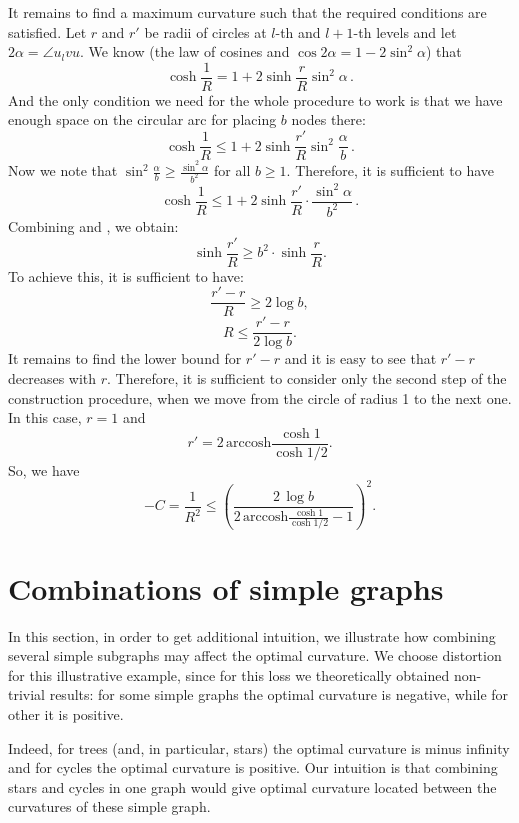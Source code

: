 \documentclass{article} %
\begin{document}
It remains to find a maximum curvature such that the required conditions are satisfied. Let $r$ and $r'$ be radii of circles at $l$-th and $l+1$-th levels and let $2\alpha = \angle u_l v u$. We know (the law of cosines and $\cos 2\alpha = 1 - 2\sin^2 \alpha$) that
\begin{equation}\label{eq:1}
\cosh \frac{1}{R} = 1 + 2 \sinh \frac{r}{R} \sin^2 \alpha \,.
\end{equation}
And the only condition we need for the whole procedure to work is that we have enough space on the circular arc for placing $b$ nodes there:
\[
\cosh \frac{1}{R} \le 1 + 2 \sinh \frac{r'}{R} \sin^2 \frac{\alpha}{b} \,.
\]
Now we note that $\sin^2 \frac{\alpha}{b} \ge \frac{\sin^2 \alpha}{b^2}$ for all $b \ge 1$. Therefore, it is sufficient to have
\begin{equation}\label{eq:2}
\cosh \frac{1}{R} \le 1 + 2 \sinh \frac{r'}{R} \cdot \frac{\sin^2 \alpha}{b^2} \,.
\end{equation}
Combining  and , we obtain:
\[
\sinh \frac{r'}{R} \ge b^2 \cdot \sinh \frac{r}{R}.
\]
To achieve this, it is sufficient to have: 
\[
\frac{r' - r}{R} \ge 2 \log b,
\]
\[
R \le \frac{r' - r}{2 \log b}.
\]
It remains to find the lower bound for $r' - r$ and it is easy to see that $r' - r$ decreases with $r$. Therefore, it is sufficient to consider only the second step of the construction procedure, when we move from the circle of radius 1 to the next one. In this case, $r = 1$ and 
\[
r' = 2 \, \mathrm{arccosh} \frac{\cosh 1}{\cosh 1/2}.
\]
So, we have 
\[
-C = \frac{1}{R^2} \le \left( \frac{2\,\log b}{2 \, \mathrm{arccosh} \frac{\cosh 1}{\cosh 1/2} - 1} \right)^2.
\]

\section{Combinations of simple graphs}\label{sec:combinations}

In this section, in order to get additional intuition, we illustrate how combining several simple subgraphs may affect the optimal curvature. 
We choose distortion for this illustrative example, since for this loss we theoretically obtained non-trivial results: for some simple graphs the optimal curvature is negative, while for other it is positive.

Indeed, for trees (and, in particular, stars) the optimal curvature is minus infinity and for cycles the optimal curvature is positive. Our intuition is that combining stars and cycles in one graph would give optimal curvature located between the curvatures of these simple graph. 
\end{document}
